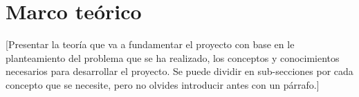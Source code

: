\section{Marco teórico}

[Presentar la teoría que va a fundamentar el proyecto con base en le planteamiento del problema que se ha realizado, los conceptos y conocimientos necesarios para desarrollar el proyecto. Se puede dividir en sub-secciones por cada concepto que se necesite, pero no olvides introducir antes con un párrafo.]